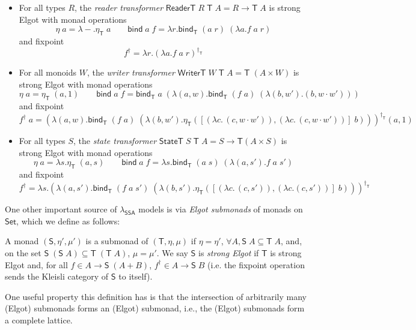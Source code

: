\documentclass[acmsmall,screen,review]{acmart}
\newcommand{\ms}[1]{\ensuremath{\mathsf{#1}}}
\newcommand{\isotopessa}{\(\lambda_{\ms{SSA}}\)}
\begin{document}
\begin{itemize}
  \item For all types $R$, the \emph{reader transformer}
  $\ms{ReaderT}\;R\;\ms{T}\;A = R \to \ms{T}\;A$ is strong Elgot 
  with monad operations
  \begin{equation}
    \eta\;a = \lambda - . \eta_{\ms{T}}\;a \qquad
    \ms{bind}\;a\;f = \lambda r. \ms{bind}_{\ms{T}}\;(a\;r)\;(\lambda a. f\;a\;r)
  \end{equation}
  and fixpoint
  \begin{equation}
    f^\dagger = \lambda r.(\lambda a. f\;a\;r)^{\dagger_{\ms{T}}} 
  \end{equation}
  \item For all monoids $W$, the \emph{writer transformer}
  $\ms{WriterT}\;W\;\ms{T}\;A = \ms{T}\;(A \times W)$ is strong Elgot 
  with monad operations
  \begin{equation}
    \eta\;a = \eta_{\ms{T}}\;(a, 1) \qquad
    \ms{bind}\;a\;f = \ms{bind}_{\ms{T}}\;a\;(\lambda (a, w). 
      \ms{bind}_{\ms{T}}\;(f\;a)\;(\lambda (b, w') . (b, w \cdot w')))
  \end{equation}
  and fixpoint
  \begin{equation}
    f^\dagger\;a = (
        \lambda (a, w). \ms{bind}_{\ms{T}}\;(f\;a)\;
          (\lambda (b, w') . \eta_{\ms{T}}([(\lambda c.\,  (c, w \cdot w')), 
                                          (\lambda c.\, (c, w \cdot w'))]\;b))
      )^{\dagger_{\ms{T}}}
      (a, 1)
  \end{equation}
  \item For all types $S$, the \emph{state transformer}
  $\ms{StateT}\;S\;\ms{T}\;A = S \to \ms{T}(A \times S)$ is strong Elgot 
  with monad operations
  \begin{equation}
    \eta\;a = \lambda s. \eta_{\ms{T}}\;(a, s) \qquad
    \ms{bind}\;a\;f = \lambda s. \ms{bind}_{\ms{T}}\;(a\;s)\;(\lambda (a, s'). f\;a\;s')
  \end{equation}
  and fixpoint
  \begin{equation}
    f^\dagger = \lambda s.(\lambda (a, s'). 
      \ms{bind}_{\ms{T}}\;(f\;a\;s')\;(\lambda (b, s') . 
        \eta_{\ms{T}}([(\lambda c.\, (c, s')), (\lambda c. (c, s'))]\;b)))^{\dagger_{\ms{T}}}
  \end{equation}
\end{itemize}

One other important source of \isotopessa{} models is via \emph{Elgot submonads}
of monads on \ms{Set}, which we define as follows:
\begin{definition}
  A monad $(\ms{S}, \eta', \mu')$ is a submonad of $(\ms{T}, \eta, \mu)$ if
  $\eta = \eta'$, $\forall A, \ms{S}\;A \subseteq \ms{T}\;A$, and, on the set
  $\ms{S}\;(\ms{S}\;A) \subseteq \ms{T}\;(\ms{T}\;A)$, $\mu = \mu'$. We say
  $\ms{S}$ is \emph{strong Elgot} if $\ms{T}$ is strong Elgot and, for all $f
  \in A \to \ms{S}\;(A + B)$, $f^\dagger \in A \to \ms{S}\;B$ (i.e. the fixpoint
  operation sends the Kleisli category of $\ms{S}$ to itself).
\end{definition}
One useful property this definition has is that the intersection of arbitrarily many (Elgot)
submonads forms an (Elgot) submonad, i.e., the (Elgot) submonads form a complete lattice.
\end{document}
